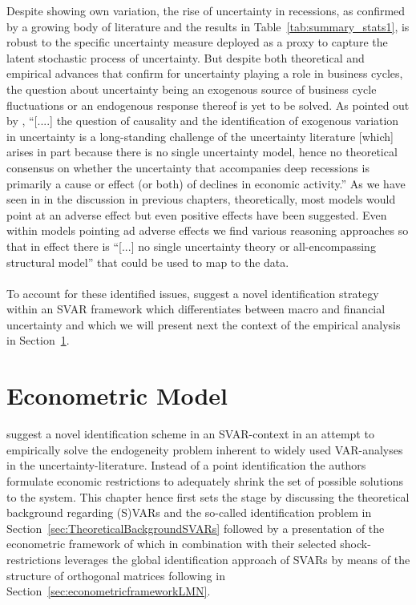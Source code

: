 \documentclass[a4paper,11pt,listof=nochaptergap,oneside,pointednumbers,bibtotoc,bigheadings,liststotoc]{scrbook}
\theoremstyle{mysatz}
\theoremstyle{mydefinition}
\theoremstyle{mytheorem}
\theoremstyle{mybemerkung}
\begin{document}
Despite showing own variation, the rise of uncertainty in recessions, as confirmed by a growing body of literature and the results in Table~\ref{tab:summary_stats1}, is robust to the specific uncertainty measure deployed as a proxy to capture the latent stochastic process of uncertainty. But despite both theoretical and empirical advances that confirm for uncertainty playing a role in business cycles, the question about uncertainty being an exogenous source of business cycle fluctuations or an endogenous response thereof is yet to be solved. As pointed out by \citet[p. 1]{ludvigsonetal:18}, ``[....] the question of causality and the identification of exogenous variation in uncertainty is a long-standing challenge of the uncertainty literature [which] arises in part because there is no single uncertainty model, hence no theoretical consensus on whether the uncertainty that accompanies deep recessions is primarily a cause or effect (or both) of declines in economic activity.'' As we have seen in in the discussion in previous chapters, theoretically, most models would point at an adverse effect but even positive effects have been suggested. Even within models pointing ad adverse effects we find various reasoning approaches so that in effect there is ``[...] no single uncertainty theory or all-encompassing structural model'' \citep[p. 5]{ludvigsonetal:18} that could be used to map to the data.\\
\\
To account for these identified issues, \citet{ludvigsonetal:18} suggest a novel identification strategy within an SVAR framework which differentiates between macro and financial uncertainty and which we will present next the context of the empirical analysis in Section~\ref{EconometricModel}.




\chapter{Econometric Model}
\label{EconometricModel}
\citet{ludvigsonetal:18} suggest a novel identification scheme in an SVAR-context in an attempt to empirically solve the endogeneity problem inherent to widely used VAR-analyses in the uncertainty-literature. Instead of a point identification the authors formulate economic restrictions to adequately shrink the set of possible solutions to the system. This chapter hence first sets the stage by discussing the theoretical background regarding (S)VARs and the so-called identification problem in Section~\ref{sec:TheoreticalBackgroundSVARs} followed by a presentation of the econometric framework of \citet{ludvigsonetal:18} which in combination with their selected shock-restrictions leverages the global identification approach of SVARs by means of the structure of orthogonal matrices following \citet{rubioetal:10}  in Section~\ref{sec:econometricframeworkLMN}.
\end{document}
